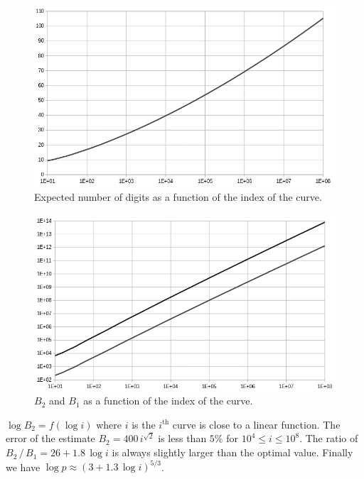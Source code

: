 \documentclass[a4paper, 11pt, pdftex]{report}
\theoremstyle{plain}
\theoremstyle{definition}
\begin{document}
\begin{figure}[!ht]
	\vspace*{1.0cm}
	\centering
	\includegraphics[width=15.5cm, angle=0]{img/digits_n.png}
	\caption{\label{fig:dgt_n} Expected number of digits as a function of the index of the curve.}
	\vspace*{1.0cm}
\end{figure}

\begin{figure}[!ht]
	\vspace*{0.0cm}
	\centering
	\includegraphics[width=15.5cm, angle=0]{img/B1_B2_n.png}
	\caption{\label{fig:B_12_n} $B_2$ and $B_1$ as a function of the index of the curve.}
\end{figure}

$\log B_2 = f(\log i)$ where $i$ is the $i^\text{th}$ curve is close to a linear function.
The error of the estimate $B_2 = 400\, i^{\sqrt{2}}$ is less than $5\%$ for
$10^4 \leq i \leq 10^8$. The ratio of $B_2\, /\, B_1 = 26 + 1.8\, \log{i}$ is always
slightly larger than the optimal value. Finally we have
$\log p \approx (3 + 1.3\, \log i)^{5/3}$.
\end{document}
